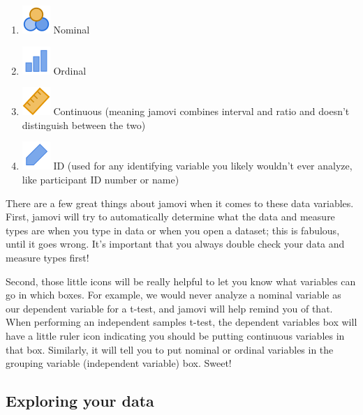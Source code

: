 \documentclass[
]{book}
\begin{document}
\begin{enumerate}
\def\labelenumi{\arabic{enumi}.}
\item
  \includegraphics{images/03-jamovi/variable-nominal.png} Nominal
\item
  \includegraphics{images/03-jamovi/variable-ordinal.png} Ordinal
\item
  \includegraphics{images/03-jamovi/variable-continuous.png} Continuous (meaning jamovi combines interval and ratio and doesn't distinguish between the two)
\item
  \includegraphics{images/03-jamovi/variable-id.png} ID (used for any identifying variable you likely wouldn't ever analyze, like participant ID number or name)
\end{enumerate}

There are a few great things about jamovi when it comes to these data variables. First, jamovi will try to automatically determine what the data and measure types are when you type in data or when you open a dataset; this is fabulous, until it goes wrong. It's important that you always double check your data and measure types first!

Second, those little icons will be really helpful to let you know what variables can go in which boxes. For example, we would never analyze a nominal variable as our dependent variable for a t-test, and jamovi will help remind you of that. When performing an independent samples t-test, the dependent variables box will have a little ruler icon indicating you should be putting continuous variables in that box. Similarly, it will tell you to put nominal or ordinal variables in the grouping variable (independent variable) box. Sweet!

\hypertarget{exploring-your-data}{%
\subsection{Exploring your data}\label{exploring-your-data}}
\end{document}
